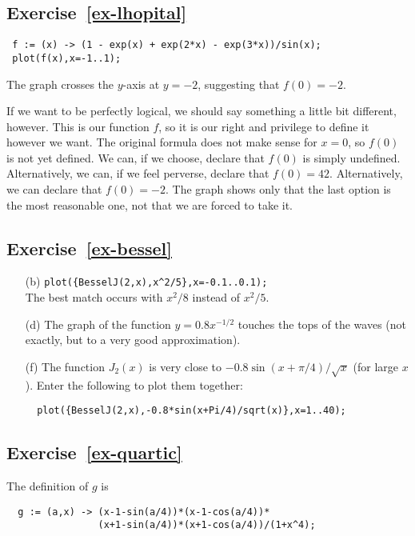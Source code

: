 \documentclass[a4paper,10pt]{amsbook}
\numberwithin{example}{chapter}
\begin{document}
\subsection*{Exercise~\ref{ex-lhopital}}
\begin{verbatim}
 f := (x) -> (1 - exp(x) + exp(2*x) - exp(3*x))/sin(x);
 plot(f(x),x=-1..1);
\end{verbatim}
The graph crosses the $y$-axis at $y=-2$, suggesting that $f(0)=-2$. 

If we want to be perfectly logical, we should say something a little
bit different, however.  This is our function $f$, so it is our right
and privilege to define it however we want.  The original formula does
not make sense for $x=0$, so $f(0)$ is not yet defined.  We can, if we
choose, declare that $f(0)$ is simply undefined.  Alternatively, we
can, if we feel perverse, declare that $f(0)=42$.  Alternatively, we
can declare that $f(0)=-2$.  The graph shows only that the last option
is the most reasonable one, not that we are forced to take it. 

\subsection*{Exercise~\ref{ex-bessel}}
\begin{itemize}
 \item[(b)] \verb~plot({BesselJ(2,x),x^2/5},x=-0.1..0.1);~\\
  The best match occurs with $x^2/8$ instead of $x^2/5$. 
 \item[(d)] The graph of the function $y=0.8x^{-1/2}$ touches the tops
  of the waves (not exactly, but to a very good approximation). 
 \item[(f)] The function $J_2(x)$ is very close to
  $-0.8\sin(x+\pi/4)/\sqrt{x}$ (for large $x$).  Enter the following
  to plot them together:
\begin{verbatim}
  plot({BesselJ(2,x),-0.8*sin(x+Pi/4)/sqrt(x)},x=1..40);
\end{verbatim}
\end{itemize}

\subsection*{Exercise~\ref{ex-quartic}}
The definition of $g$ is
\begin{verbatim}
  g := (a,x) -> (x-1-sin(a/4))*(x-1-cos(a/4))*
                (x+1-sin(a/4))*(x+1-cos(a/4))/(1+x^4);
\end{verbatim}
\end{document}
